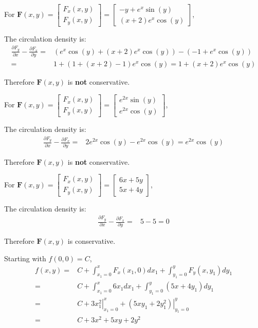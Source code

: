 \documentclass{article}
\newcommand{\colxyvec}[2]{\begin{bmatrix} #1 \\ #2 \end{bmatrix}}
\newcommand{\at}[1]{\left. #1 \right|}
\newcommand{\dr}[1]{\textcolor{dark_red}{#1}}
\begin{document}
\begin{framed}
\dr{For \(\mathbf{F}(x,y) = \colxyvec{F_x(x,y)}{F_y(x,y)} = \colxyvec{-y + e^x\sin(y)}{(x + 2)e^x\cos(y)}\),}

\dr{The circulation density is:
\begin{align*}
\frac{\partial F_y}{\partial x} - \frac{\partial F_x}{\partial y} = & (e^x\cos(y) + (x + 2)e^x\cos(y)) - (-1 + e^x\cos(y)) \\
= & 1 + (1 + (x+2) - 1)e^x\cos(y) = 1 + (x+2)e^x\cos(y)
\end{align*}}

\dr{Therefore \(\mathbf{F}(x,y)\) is {\bf not} conservative.}

\end{framed}

\begin{framed}
\dr{For \(\mathbf{F}(x,y) = \colxyvec{F_x(x,y)}{F_y(x,y)} = \colxyvec{e^{2x}\sin(y)}{e^{2x}\cos(y)}\),}

\dr{The circulation density is: 
\begin{align*}
\frac{\partial F_y}{\partial x} - \frac{\partial F_x}{\partial y} = & 2e^{2x}\cos(y) - e^{2x}\cos(y) = e^{2x}\cos(y)
\end{align*}}

\dr{Therefore \(\mathbf{F}(x,y)\) is {\bf not} conservative.}

\end{framed}

\pagebreak

\begin{framed}
\dr{For \(\mathbf{F}(x,y) = \colxyvec{F_x(x,y)}{F_y(x,y)} = \colxyvec{6x + 5y}{5x + 4y}\),}

\dr{The circulation density is: 
\begin{align*}
\frac{\partial F_y}{\partial x} - \frac{\partial F_x}{\partial y} = & 5 - 5 = 0
\end{align*}}

\dr{Therefore \(\mathbf{F}(x,y)\) is conservative.}

\dr{Starting with \(f(0,0) = C\),
\begin{align*}
f(x,y) = & C + \int_{x_1 = 0}^x F_x(x_1,0)dx_1 + \int_{y_1 = 0}^y F_y(x,y_1)dy_1 \\
= & C + \int_{x_1 = 0}^x 6x_1dx_1 + \int_{y_1 = 0}^y (5x + 4y_1)dy_1 \\
= & C + \at{3x_1^2}_{x_1 = 0}^x + \at{(5xy_1 + 2y_1^2)}_{y_1 = 0}^y \\
= & C + 3x^2 + 5xy + 2y^2
\end{align*}}

\end{framed}
\end{document}
